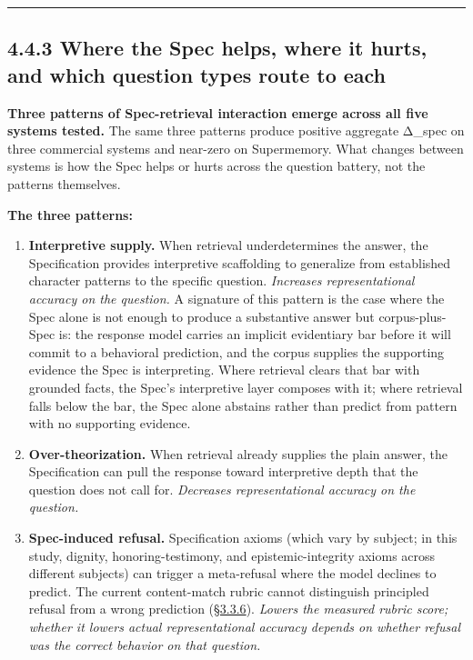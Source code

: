 \begin{center}\rule{0.5\linewidth}{0.5pt}\end{center}

\hypertarget{where-the-spec-helps-where-it-hurts-and-which-question-types-route-to-each}{%
\subsection{4.4.3 Where the Spec helps, where it hurts, and which
question types route to
each}\label{where-the-spec-helps-where-it-hurts-and-which-question-types-route-to-each}}

\textbf{Three patterns of Spec-retrieval interaction emerge across all
five systems tested.} The same three patterns produce positive aggregate
Δ\_spec on three commercial systems and near-zero on Supermemory. What
changes between systems is how the Spec helps or hurts across the
question battery, not the patterns themselves.

\textbf{The three patterns:}

\begin{enumerate}
\def\labelenumi{\arabic{enumi}.}
\tightlist
\item
  \textbf{Interpretive supply.} When retrieval underdetermines the
  answer, the Specification provides interpretive scaffolding to
  generalize from established character patterns to the specific
  question. \emph{Increases representational accuracy on the question.}
  A signature of this pattern is the case where the Spec alone is not
  enough to produce a substantive answer but corpus-plus-Spec is: the
  response model carries an implicit evidentiary bar before it will
  commit to a behavioral prediction, and the corpus supplies the
  supporting evidence the Spec is interpreting. Where retrieval clears
  that bar with grounded facts, the Spec's interpretive layer composes
  with it; where retrieval falls below the bar, the Spec alone abstains
  rather than predict from pattern with no supporting evidence.
\item
  \textbf{Over-theorization.} When retrieval already supplies the plain
  answer, the Specification can pull the response toward interpretive
  depth that the question does not call for. \emph{Decreases
  representational accuracy on the question.}
\item
  \textbf{Spec-induced refusal.} Specification axioms (which vary by
  subject; in this study, dignity, honoring-testimony, and
  epistemic-integrity axioms across different subjects) can trigger a
  meta-refusal where the model declines to predict. The current
  content-match rubric cannot distinguish principled refusal from a
  wrong prediction (\hyperref[rubric-handling-limitations-post-hoc-validity-audit]{§3.3.6}). \emph{Lowers the measured rubric score;
  whether it lowers actual representational accuracy depends on whether
  refusal was the correct behavior on that question.}
\end{enumerate}

